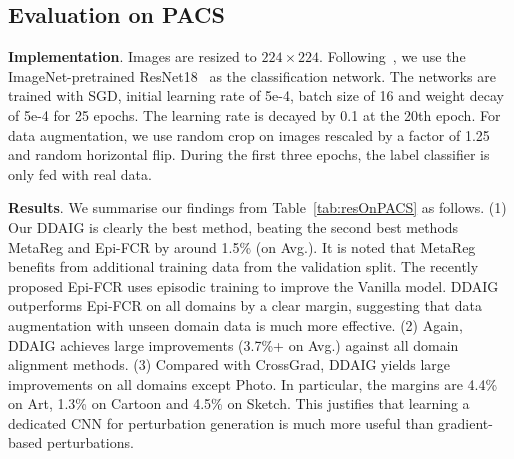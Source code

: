 \documentclass[letterpaper]{article}
\newcommand{\keypoint}[1]{\vspace{0.1cm}\noindent\textbf{#1}}
\begin{document}
\subsection{Evaluation on PACS}
\keypoint{Implementation}.
Images are resized to $224 \times 224$. Following~\cite{cvpr19JiGen,li2019episodic}, we use the ImageNet-pretrained ResNet18~\cite{he2016deep} as the classification network.
The networks are trained with SGD, initial learning rate of 5e-4, batch size of 16 and weight decay of 5e-4 for 25 epochs. The learning rate is decayed by 0.1 at the 20th epoch.
For data augmentation, we use random crop on images rescaled by a factor of 1.25 and random horizontal flip.
During the first three epochs, the label classifier is only fed with real data.


\keypoint{Results}.
We summarise our findings from Table~\ref{tab:resOnPACS} as follows.
(1) Our DDAIG is clearly the best  method, beating the second best methods MetaReg and Epi-FCR by around 1.5\% (on Avg.). It is noted that MetaReg benefits from additional training data from the validation split. The recently proposed Epi-FCR uses episodic training to improve the Vanilla model. DDAIG outperforms Epi-FCR on all domains by a clear margin, suggesting that data augmentation with unseen domain data is much more effective.
(2) Again, DDAIG achieves large improvements (3.7\%+ on Avg.) against all domain alignment methods.
(3) Compared with CrossGrad, DDAIG yields large improvements on all domains except Photo. In particular, the margins are 4.4\% on Art, 1.3\% on Cartoon and 4.5\% on Sketch. This justifies that learning a dedicated CNN for perturbation generation is much more useful than gradient-based perturbations.
\end{document}
